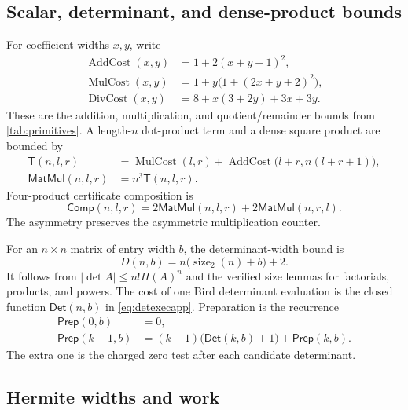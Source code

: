 \documentclass[11pt]{article}
\theoremstyle{definition}
\newcommand{\natsize}{\operatorname{size}_2}
\newcommand{\AddCost}{\operatorname{AddCost}}
\newcommand{\MulCost}{\operatorname{MulCost}}
\newcommand{\DivCost}{\operatorname{DivCost}}
\begin{document}
\subsection{Scalar, determinant, and dense-product bounds}

For coefficient widths $x,y$, write
\begin{align}
 \AddCost(x,y)&=1+2(x+y+1)^2,\label{eq:addbound}\\
 \MulCost(x,y)&=1+y\bigl(1+(2x+y+2)^2\bigr),\label{eq:mulbound}\\
 \DivCost(x,y)&=8+x(3+2y)+3x+3y.\label{eq:divbound}
\end{align}
These are the addition, multiplication, and quotient/remainder bounds from \cref{tab:primitives}.  A length-$n$ dot-product term and a dense square product are bounded by
\begin{align}
 \mathsf T(n,l,r)
  &=\MulCost(l,r)+
    \AddCost\bigl(l+r,n(l+r+1)\bigr),\label{eq:dotbound}\\
 \mathsf{MatMul}(n,l,r)
  &=n^3\mathsf T(n,l,r).\label{eq:matmulbound}
\end{align}
Four-product certificate composition is
\begin{equation}
 \mathsf{Comp}(n,l,r)=
  2\mathsf{MatMul}(n,l,r)+2\mathsf{MatMul}(n,r,l).
 \label{eq:compbound}
\end{equation}
The asymmetry preserves the asymmetric multiplication counter.

For an $n\times n$ matrix of entry width $b$, the determinant-width bound is
\begin{equation}
  D(n,b)=n\bigl(\natsize(n)+b\bigr)+2.
  \label{eq:detbound}
\end{equation}
It follows from $|\det A|\le n!H(A)^n$ and the verified size lemmas for factorials, products, and powers.  The cost of one Bird determinant evaluation is the closed function $\mathsf{Det}(n,b)$ in \eqref{eq:detexecapp}.  Preparation is the recurrence
\begin{align}
 \mathsf{Prep}(0,b)&=0,\label{eq:prep0}\\
 \mathsf{Prep}(k+1,b)&=(k+1)\bigl(\mathsf{Det}(k,b)+1\bigr)
                       +\mathsf{Prep}(k,b).
 \label{eq:preprec}
\end{align}
The extra one is the charged zero test after each candidate determinant.

\subsection{Hermite widths and work}
\end{document}
